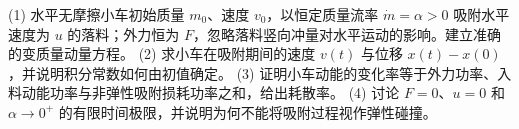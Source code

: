 (1) 水平无摩擦小车初始质量 \(m_0\)、速度 \(v_0\)，以恒定质量流率 \(\dot m=\alpha>0\) 吸附水平速度为 \(u\) 的落料；外力恒为 \(F\)，忽略落料竖向冲量对水平运动的影响。建立准确的变质量动量方程。
(2) 求小车在吸附期间的速度 \(v(t)\) 与位移 \(x(t)-x(0)\)，并说明积分常数如何由初值确定。
(3) 证明小车动能的变化率等于外力功率、入料动能功率与非弹性吸附损耗功率之和，给出耗散率。
(4) 讨论 \(F=0\)、\(u=0\) 和 \(\alpha\to0^+\) 的有限时间极限，并说明为何不能将吸附过程视作弹性碰撞。
